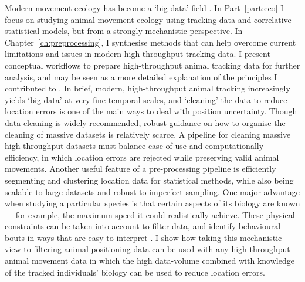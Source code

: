 Modern movement ecology has become a `big data' field \parencite{nathan2022}.
In Part~\ref{part:eco} I focus on studying animal movement ecology using tracking data and correlative statistical models, but from a strongly mechanistic perspective.
In Chapter~\ref{ch:preprocessing}, I synthesise methods that can help overcome current limitations and issues in modern high-throughput tracking data.
I present conceptual workflows to prepare high-throughput animal tracking data for further analysis, and may be seen as a more detailed explanation of the principles I contributed to \parencite{nathan2022}.
In brief, modern, high-throughput animal tracking increasingly yields `big data' at very fine temporal scales, and `cleaning' the data to reduce location errors is one of the main ways to deal with position uncertainty.
Though data cleaning is widely recommended, robust guidance on how to organise the cleaning of massive datasets is relatively scarce.
A pipeline for cleaning massive high-throughput datasets must balance ease of use and computationally efficiency, in which location errors are rejected while preserving valid animal movements. 
Another useful feature of a pre-processing pipeline is efficiently segmenting and clustering location data for statistical methods, while also being scalable to large datasets and robust to imperfect sampling.
One major advantage when studying a particular species is that certain aspects of its biology are known --- for example, the maximum speed it could realistically achieve.
These physical constraints can be taken into account to filter data, and identify behavioural bouts in ways that are easy to interpret \parencite[][]{barraquand2008}.
I show how taking this mechanistic view to filtering animal positioning data can be used with any high-throughput animal movement data in which the high data-volume combined with knowledge of the tracked individuals' biology can be used to reduce location errors.

